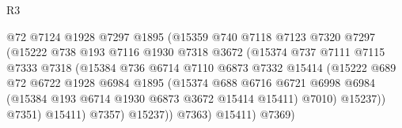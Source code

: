 \begin{lexlean}{R3}
\begin{coremodule}
                                    @72
                                    @7124
                                    @1928
                                    @7297
                                    @1895
                                    (@15359
                                      @740
                                      @7118
                                      @7123
                                      @7320
                                      @7297
                                      (@15222
                                        @738
                                        @193
                                        @7116
                                        @1930
                                        @7318
                                        @3672
                                        (@15374
                                          @737
                                          @7111
                                          @7115
                                          @7333
                                          @7318
                                          (@15384
                                            @736
                                            @6714
                                            @7110
                                            @6873
                                            @7332
                                            @15414
                                            (@15222
                                              @689
                                              @72
                                              @6722
                                              @1928
                                              @6984
                                              @1895
                                              (@15374
                                                @688
                                                @6716
                                                @6721
                                                @6998
                                                @6984
                                                (@15384 @193 @6714 @1930 @6873 @3672 @15414 @15411)
                                                @7010)
                                              @15237))
                                          @7351)
                                        @15411)
                                      @7357)
                                    @15237))
                                @7363)
                              @15411)
                            @7369)

\end{coremodule}
\end{lexlean}
